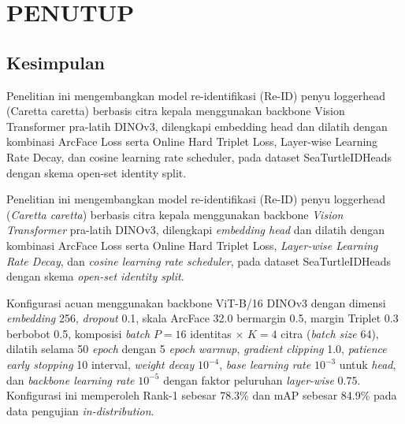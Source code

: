 \chapter{PENUTUP}

\section{Kesimpulan}

Penelitian ini mengembangkan model re-identifikasi (Re-ID) penyu loggerhead (Caretta caretta) berbasis citra kepala menggunakan backbone Vision Transformer pra-latih DINOv3, dilengkapi embedding head dan dilatih dengan kombinasi ArcFace Loss serta Online Hard Triplet Loss, Layer-wise Learning Rate Decay, dan cosine learning rate scheduler, pada dataset SeaTurtleIDHeads dengan skema open-set identity split.

Penelitian ini mengembangkan model re-identifikasi (Re-ID) penyu loggerhead
(\textit{Caretta caretta}) berbasis citra kepala menggunakan backbone
\textit{Vision Transformer} pra-latih DINOv3, dilengkapi \textit{embedding head}
dan dilatih dengan kombinasi ArcFace Loss serta Online Hard Triplet Loss,
\textit{Layer-wise Learning Rate Decay}, dan \textit{cosine learning rate
scheduler}, pada dataset SeaTurtleIDHeads dengan skema \textit{open-set identity
split}.

Konfigurasi acuan menggunakan backbone ViT-B/16 DINOv3 dengan dimensi
\textit{embedding} 256, \textit{dropout} 0.1, skala ArcFace 32.0 bermargin 0.5,
margin Triplet 0.3 berbobot 0.5, komposisi \textit{batch} $P{=}16$ identitas
$\times$ $K{=}4$ citra (\textit{batch size} 64), dilatih selama 50 \textit{epoch}
dengan 5 \textit{epoch} \textit{warmup}, \textit{gradient clipping} 1.0,
\textit{patience early stopping} 10 interval, \textit{weight decay} $10^{-4}$,
\textit{base learning rate} $10^{-3}$ untuk \textit{head}, dan
\textit{backbone learning rate} $10^{-5}$ dengan faktor peluruhan
\textit{layer-wise} 0.75. Konfigurasi ini memperoleh Rank-1 sebesar 78.3\% dan
mAP sebesar 84.9\% pada data pengujian \textit{in-distribution}.

